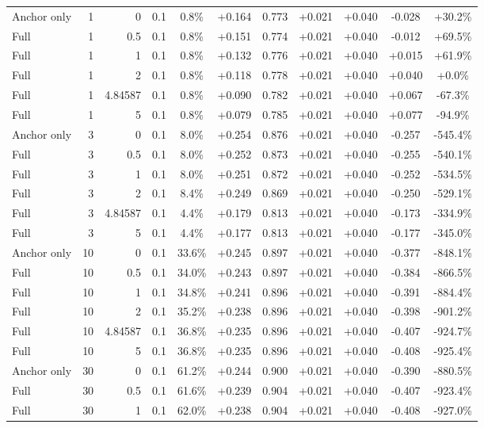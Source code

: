 \begin{table}[htbp]
\begin{tabular}{lrrrccccccc}
Anchor only & 1 & 0 & 0.1 & 0.8\% & +0.164 & 0.773 & +0.021 & +0.040 & -0.028 & +30.2\% \\
Full & 1 & 0.5 & 0.1 & 0.8\% & +0.151 & 0.774 & +0.021 & +0.040 & -0.012 & +69.5\% \\
Full & 1 & 1 & 0.1 & 0.8\% & +0.132 & 0.776 & +0.021 & +0.040 & +0.015 & +61.9\% \\
Full & 1 & 2 & 0.1 & 0.8\% & +0.118 & 0.778 & +0.021 & +0.040 & +0.040 & +0.0\% \\
Full & 1 & 4.84587 & 0.1 & 0.8\% & +0.090 & 0.782 & +0.021 & +0.040 & +0.067 & -67.3\% \\
Full & 1 & 5 & 0.1 & 0.8\% & +0.079 & 0.785 & +0.021 & +0.040 & +0.077 & -94.9\% \\
Anchor only & 3 & 0 & 0.1 & 8.0\% & +0.254 & 0.876 & +0.021 & +0.040 & -0.257 & -545.4\% \\
Full & 3 & 0.5 & 0.1 & 8.0\% & +0.252 & 0.873 & +0.021 & +0.040 & -0.255 & -540.1\% \\
Full & 3 & 1 & 0.1 & 8.0\% & +0.251 & 0.872 & +0.021 & +0.040 & -0.252 & -534.5\% \\
Full & 3 & 2 & 0.1 & 8.4\% & +0.249 & 0.869 & +0.021 & +0.040 & -0.250 & -529.1\% \\
Full & 3 & 4.84587 & 0.1 & 4.4\% & +0.179 & 0.813 & +0.021 & +0.040 & -0.173 & -334.9\% \\
Full & 3 & 5 & 0.1 & 4.4\% & +0.177 & 0.813 & +0.021 & +0.040 & -0.177 & -345.0\% \\
Anchor only & 10 & 0 & 0.1 & 33.6\% & +0.245 & 0.897 & +0.021 & +0.040 & -0.377 & -848.1\% \\
Full & 10 & 0.5 & 0.1 & 34.0\% & +0.243 & 0.897 & +0.021 & +0.040 & -0.384 & -866.5\% \\
Full & 10 & 1 & 0.1 & 34.8\% & +0.241 & 0.896 & +0.021 & +0.040 & -0.391 & -884.4\% \\
Full & 10 & 2 & 0.1 & 35.2\% & +0.238 & 0.896 & +0.021 & +0.040 & -0.398 & -901.2\% \\
Full & 10 & 4.84587 & 0.1 & 36.8\% & +0.235 & 0.896 & +0.021 & +0.040 & -0.407 & -924.7\% \\
Full & 10 & 5 & 0.1 & 36.8\% & +0.235 & 0.896 & +0.021 & +0.040 & -0.408 & -925.4\% \\
Anchor only & 30 & 0 & 0.1 & 61.2\% & +0.244 & 0.900 & +0.021 & +0.040 & -0.390 & -880.5\% \\
Full & 30 & 0.5 & 0.1 & 61.6\% & +0.239 & 0.904 & +0.021 & +0.040 & -0.407 & -923.4\% \\
Full & 30 & 1 & 0.1 & 62.0\% & +0.238 & 0.904 & +0.021 & +0.040 & -0.408 & -927.0\% \\

\end{tabular}
\end{table}
